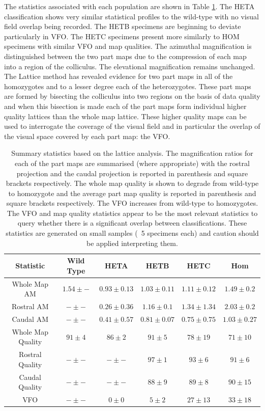 The statistics associated with each population are shown in Table \ref{table:lattticestats}. The HETA classification shows very similar statistical profiles to the wild-type with no visual field overlap being recorded. The HETB specimens are beginning to deviate particularly in VFO. The HETC specimens present more similarly to HOM specimens with similar VFO and map qualities. The azimuthal magnification is distinguished between the two part maps due to the compression of each map into a region of the colliculus. The elevational magnification remains unchanged. The Lattice method has revealed evidence for two part maps in all of the homozygotes and to a lesser degree each of the heterozygotes. These part maps are formed by bisecting the colliculus into two regions on the basis of data quality and when this bisection is made each of the part maps form individual higher quality lattices than the whole map lattice. These higher quality maps can be used to interrogate the coverage of the visual field and in particular the overlap of the visual space covered by each part map: the VFO. 
\begin{table}[h!]
	\centering
	\begin{tabular}{|c|c c c c c|}
	\hline
	\textbf{Statistic}  & Wild Type & HETA & HETB & HETC & Hom\\
	\hline
	Whole Map AM & $1.54  \pm -$ & $0.93 \pm 0.13$ & $1.03 \pm 0.11$  & $1.11 \pm 0.12$ & $1.49 \pm 0.2$ \\
	Rostral AM & $- \pm -$ & $0.26 \pm 0.36$ & $1.16 \pm 0.1$  & $1.34 \pm 1.34$ & $2.03 \pm 0.2$ \\
	Caudal AM & $- \pm -$ & $0.41 \pm 0.57$ & $0.81 \pm 0.07$  & $ 0.75 \pm 0.75$ & $1.03 \pm 0.27$ \\
	Whole Map Quality & $91 \pm 4$ & $86 \pm 2$ & $91 \pm 5$  & $78 \pm 19$ & $71 \pm 10$ \\
	Rostral Quality & $- \pm -$ & $- \pm -$ & $97 \pm 1$  & $93 \pm 6$ & $91 \pm 6$ \\
	Caudal Quality & $- \pm -$ & $- \pm -$ & $88 \pm 9$  & $89 \pm 8$ & $90 \pm 15$ \\
	VFO& $- \pm -$ & $0 \pm 0$ & $5 \pm 2$  & $ 27 \pm 13$ & $33 \pm 18$ \\
	\hline
	\end{tabular}
	\def\c{Summary statistics based on the lattice analysis. }
	\caption[\c]{\c The magnification ratios for each of the part maps are summarised (where appropriate) with the rostral projection and the caudal projection is reported in parenthesis and square brackets respectively. The whole map quality is shown to degrade from wild-type to homozygote and the average part map quality is reported in parenthesis and square brackets respectively. The VFO increases from wild-type to homozygotes. The VFO and map quality statistics appear to be the most relevant statistics to query whether there is a significant overlap between classifications. These statistics are generated on small samples (~5 specimens each) and caution should be applied interpreting them. \label{table:lattticestats}}
\end{table}
